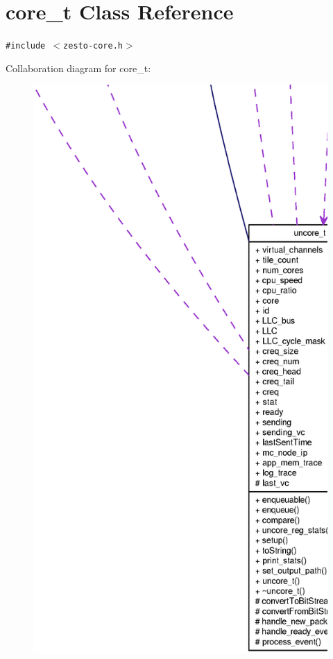 \section{core\_\-t Class Reference}
\label{classcore__t}
{\tt \#include $<$zesto-core.h$>$}

Collaboration diagram for core\_\-t:\nopagebreak
\begin{figure}[H]
\begin{center}
\leavevmode
\includegraphics[width=400pt]{classcore__t__coll__graph}
\end{center}
\end{figure}
